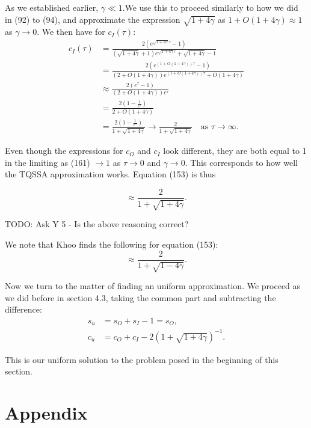 \documentclass[12pt]{article}
\begin{document}
As we established earlier, $\gamma \ll 1$.We use this to proceed
similarly to how we did in (92) to (94), and approximate the
expression $\sqrt{1+4\gamma}$ as $1+O(1+4\gamma) \approx 1$ as
$\gamma \to 0$. We then have for $c_I(\tau)$:
\begin{align}
c_I(\tau) &=
     \frac{2(e^{\sqrt{1+4\gamma} \tau} - 1)}
   {(\sqrt{1+4\gamma} + 1) e^{\sqrt{1+4\gamma} \tau} + \sqrt{1+4\gamma} - 1} \\
&= \frac{2(e^{(1+O(1+4\gamma)) \tau} - 1)}
        {(2 + O(1+4\gamma)) e^{(1+O(1+4\gamma)) \tau} + O(1+4\gamma)} \\
&\approx \frac{2(e^{\tau} - 1)}
              {(2 + O(1+4\gamma)) e^{\tau}} \\
&= \frac{2(1 - \frac{1}{e^{\tau}})}
        {2 + O(1+4\gamma)} \\
&= \frac{2(1 - \frac{1}{e^{\tau}})}
        {1 + \sqrt{1+4\gamma}}
   \to \frac{2} {1 + \sqrt{1+4\gamma}} \quad \text{as } \tau \to \infty.
\end{align}

Even though the expressions for $c_O$ and $c_I$ look different, they
are both equal to 1 in the limiting as (161) $\to 1$ as $\tau \to 0$
and $\gamma \to 0$. This corresponds to how well the TQSSA
approximation works. Equation (153) is thus

\begin{equation}
\approx \frac{2} {1 + \sqrt{1+4\gamma}}.
\end{equation}

TODO: Ask Y 5 - Is the above reasoning correct?

We note that Khoo finds the following for equation (153):
\begin{equation}
\approx \frac{2}{1+\sqrt{1-4\gamma}}.
\end{equation}

Now we turn to the matter of finding an uniform approximation. We
proceed as we did before in section 4.3, taking the common part and
subtracting the difference:
\begin{align}
s_u &= s_O + s_I - 1 = s_O, \\
c_u &= c_O + c_I - 2(1 + \sqrt{1+4\gamma})^{-1}.
\end{align}

This is our uniform solution to the problem posed in the beginning of
this section.

\newpage
\section{Appendix}
\end{document}
